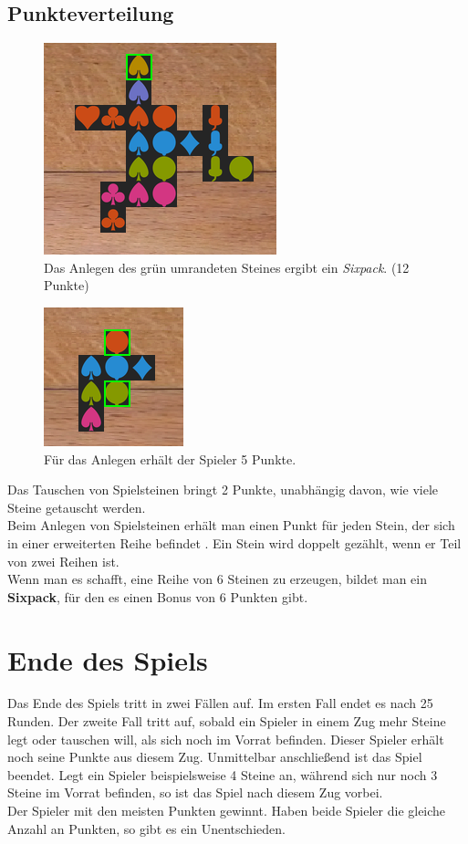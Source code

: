 \documentclass[a4paper, ngerman]{scrartcl}
\begin{document}
\subsection{Punkteverteilung}
\begin{figure}[h]
\centering
	\includegraphics[scale = 0.6]{images/sixpack_legen}
		\caption{Das Anlegen des grün umrandeten Steines ergibt ein \emph{Sixpack}. (12 Punkte)}
		\label{fig:PunkteSixpack}	
\end{figure}
\begin{figure}
	\centering	
		\includegraphics[scale = 0.7]{images/anlegen04}
		\caption{Für das Anlegen erhält der Spieler 5 Punkte.}
		\label{fig:Punkte1}	
\end{figure}
Das Tauschen von Spielsteinen bringt 2 Punkte, unabhängig davon, wie viele Steine getauscht werden.\\
Beim Anlegen von Spielsteinen erhält man einen Punkt für jeden Stein, der sich in einer erweiterten Reihe befindet . Ein Stein wird doppelt gezählt, wenn er Teil von zwei Reihen ist.\\
Wenn man es schafft, eine Reihe von 6 Steinen zu erzeugen, bildet man ein \textbf{Sixpack}, für den es einen Bonus von 6 Punkten gibt.
\newpage
	
\section{Ende des Spiels}
\label{sec:gameOver}
Das Ende des Spiels tritt in zwei Fällen auf. Im ersten Fall endet es nach 25 Runden. Der zweite Fall tritt auf, sobald ein Spieler in einem Zug mehr Steine legt oder tauschen will, als sich noch im Vorrat befinden. Dieser Spieler erhält noch seine Punkte aus diesem Zug. Unmittelbar anschließend ist das Spiel beendet. Legt ein Spieler beispielsweise 4 Steine an, während sich nur noch 3 Steine im Vorrat befinden, so ist das Spiel nach diesem Zug vorbei.\\
Der Spieler mit den meisten Punkten gewinnt. Haben beide Spieler die gleiche Anzahl an Punkten, so gibt es ein Unentschieden.
\end{document}
